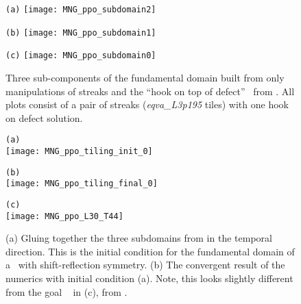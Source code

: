 \begin{description}
\begin{figure}
\begin{minipage}[height=.20\textheight]{.9\textwidth}
\centering \small{\texttt{(a)}}
\texttt{[image: MNG\_ppo\_subdomain2]}
\end{minipage}
\begin{minipage}[height=.20\textheight]{.9\textwidth}
\centering \small{\texttt{(b)}}
\texttt{[image: MNG\_ppo\_subdomain1]}
\end{minipage}
\begin{minipage}[height=.20\textheight]{.9\textwidth}
\centering \small{\texttt{(c)}}
\texttt{[image: MNG\_ppo\_subdomain0]}
\end{minipage}
\caption{ \label{fig:MNG_pposubdomains_zero}
Three sub-components of the fundamental domain built from only manipulations of streaks
and the ``hook on top of defect'' \twot\ from . All plots consist
of a pair of streaks (\emph{eqva\_L3p195} tiles) with one hook on defect solution.
}
\end{figure}

\begin{figure}
\begin{minipage}[height=.3\textheight]{.5\textwidth}
\centering \small{\texttt{(a)}}\\
\texttt{[image: MNG\_ppo\_tiling\_init\_0]}
\end{minipage}
\begin{minipage}[height=.3\textheight]{.5\textwidth}
\centering \small{\texttt{(b)}}\\
\texttt{[image: MNG\_ppo\_tiling\_final\_0]}
\end{minipage}
\begin{minipage}[height=.30\textheight]{.5\textwidth}
\centering \small{\texttt{(c)}}\\
\texttt{[image: MNG\_ppo\_L30\_T44]}
\end{minipage}
\caption{ \label{fig:MNG_ppotiling_zero}
(a) Gluing together the three subdomains from 
in the temporal direction. This is the initial condition for the fundamental domain
of a \twot\ with shift-reflection symmetry.
(b) The convergent result of the numerics with initial condition (a). Note, this looks
slightly different from the goal \twot\
in (c),
from .
}
\end{figure}



\end{description}

